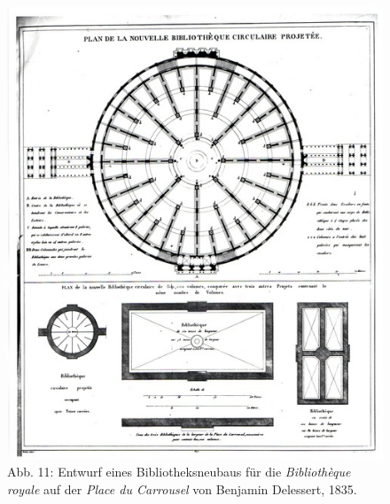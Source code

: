 \begin{figure}[htbp]
\centering
\includegraphics{img/wagner-11.jpg}
\caption*{Abb. 11: Entwurf eines Bibliotheksneubaus für die
\emph{Bibliothèque royale} auf der \emph{Place du Carrousel} von
Benjamin Delessert, 1835.}
\end{figure}

